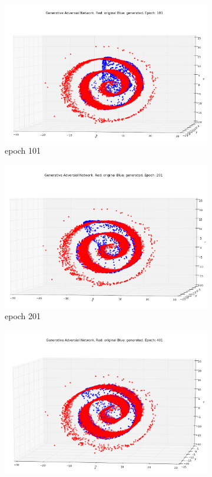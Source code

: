 \begin{figure}
\begin{subfigure}[t]{.4\textwidth}
\centering
\includegraphics[width=\linewidth]{GANResults/Both101.png}
\caption{epoch 101}
\end{subfigure}
%
\begin{subfigure}[t]{.4\textwidth}
\centering
\includegraphics[width=\linewidth]{GANResults/Both201.png}
\caption{epoch 201}
\end{subfigure}
\medskip
\begin{subfigure}[t]{.4\textwidth}
\centering
\includegraphics[width=\linewidth]{GANResults/Both401.png}

\end{subfigure}
\end{figure}
